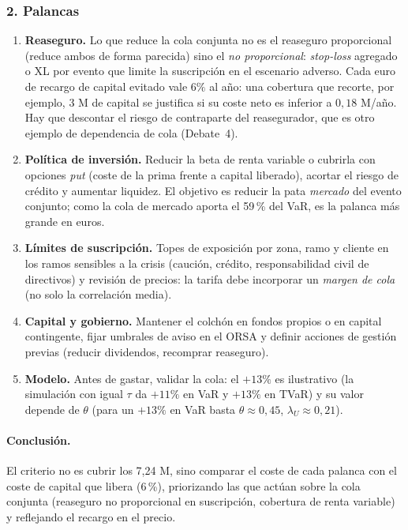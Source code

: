 \documentclass[a4paper,12pt]{article}
\newcommand{\euro}{\texteuro}
\begin{document}
\subsubsection*{2. Palancas}
\begin{enumerate}[leftmargin=*,itemsep=3pt]
\item \textbf{Reaseguro.} Lo que reduce la cola conjunta no es el reaseguro proporcional (reduce ambos de forma parecida) sino el \emph{no proporcional}: \emph{stop-loss} agregado o XL por evento que limite la suscripción en el escenario adverso. Cada euro de recargo de capital evitado vale $6\%$ al año: una cobertura que recorte, por ejemplo, 3 M\euro{} de capital se justifica si su coste neto es inferior a $0{,}18$ M\euro/año. Hay que descontar el riesgo de contraparte del reasegurador, que es otro ejemplo de dependencia de cola (Debate~4).
\item \textbf{Política de inversión.} Reducir la beta de renta variable o cubrirla con opciones \emph{put} (coste de la prima frente a capital liberado), acortar el riesgo de crédito y aumentar liquidez. El objetivo es reducir la pata \emph{mercado} del evento conjunto; como la cola de mercado aporta el 59\,\% del VaR, es la palanca más grande en euros.
\item \textbf{Límites de suscripción.} Topes de exposición por zona, ramo y cliente en los ramos sensibles a la crisis (caución, crédito, responsabilidad civil de directivos) y revisión de precios: la tarifa debe incorporar un \emph{margen de cola} (no solo la correlación media).
\item \textbf{Capital y gobierno.} Mantener el colchón en fondos propios o en capital contingente, fijar umbrales de aviso en el ORSA y definir acciones de gestión previas (reducir dividendos, recomprar reaseguro).
\item \textbf{Modelo.} Antes de gastar, validar la cola: el $+13\%$ es ilustrativo (la simulación con igual $\tau$ da $+11\%$ en VaR y $+13\%$ en TVaR) y su valor depende de $\theta$ (para un $+13\%$ en VaR basta $\theta\approx0{,}45$, $\lambda_U\approx0{,}21$).
\end{enumerate}

\paragraph{Conclusión.} El criterio no es \guillemotleft{}cubrir los 7,24 M\euro\guillemotright{}, sino comparar el coste de cada palanca con el coste de capital que libera (6\,\%), priorizando las que actúan sobre la cola conjunta (reaseguro no proporcional en suscripción, cobertura de renta variable) y reflejando el recargo en el precio.
\end{document}
